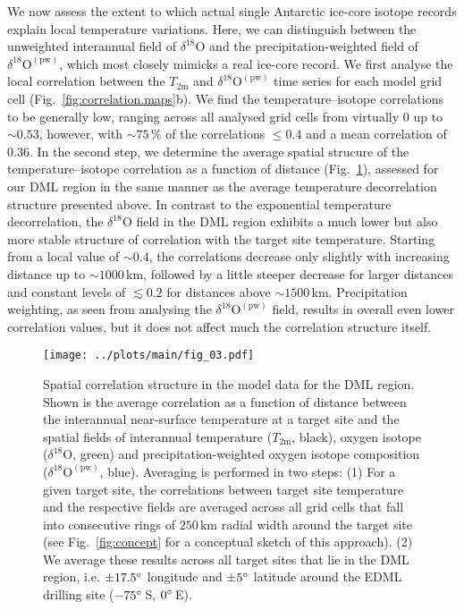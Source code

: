 \documentclass[cp, manuscript]{copernicus}
\begin{document}
We now assess the extent to which actual single Antarctic ice-core isotope
records explain local temperature variations. Here, we can distinguish between
the unweighted interannual field of $\delta^{18}\mathrm{O}$ and the
precipitation-weighted field of $\delta^{18}\mathrm{O}^{\mathrm{(pw)}}$, which
most closely mimicks a real ice-core record. We first analyse the local
correlation between the $T_{2\mathrm{m}}$ and
$\delta^{18}\mathrm{O}^{\mathrm{(pw)}}$ time series for each model grid cell
(Fig.~\ref{fig:correlation.maps}b). We find the temperature--isotope correlations
to be generally low, ranging across all analysed grid cells from virtually $0$
up to $\sim0.53$, however, with $\sim75\,\%$ of the correlations $\leq0.4$ and a
mean correlation of $0.36$. In the second step, we determine the average spatial
strucure of the temperature--isotope correlation as a function of distance
(Fig.~\ref{fig:avg.decor.lengths}), assessed for our DML region in the same
manner as the average temperature decorrelation structure presented above. In
contrast to the exponential temperature decorrelation, the
$\delta^{18}\mathrm{O}$ field in the DML region exhibits a much lower but also
more stable structure of correlation with the target site temperature. Starting
from a local value of $\sim0.4$, the correlations decrease only slightly with
increasing distance up to $\sim1000$\,km, followed by a little steeper decrease
for larger distances and constant levels of $\lesssim0.2$ for distances above
$\sim1500$\,km. Precipitation weighting, as seen from analysing the
$\delta^{18}\mathrm{O}^{\mathrm{(pw)}}$ field, results in overall even lower
correlation values, but it does not affect much the correlation structure
itself.

\begin{figure}[t]%
\centering
\texttt{[image: ../plots/main/fig\_03.pdf]}
\caption{%
  Spatial correlation structure in the model data for the DML region. Shown is
  the average correlation as a function of distance between the interannual
  near-surface temperature at a target site and the spatial fields of
  interannual temperature ($T_{2\mathrm{m}}$, black), oxygen isotope
  ($\delta^{18}\mathrm{O}$, green) and precipitation-weighted oxygen isotope
  composition ($\delta^{18}\mathrm{O}^{\mathrm{(pw)}}$, blue). Averaging is
  performed in two steps: (1) For a given target site, the correlations between
  target site temperature and the respective fields are averaged across all grid
  cells that fall into consecutive rings of $250$\,km radial width around the
  target site (see Fig.~\ref{fig:concept} for a conceptual sketch of this
  approach). (2) We average these results across all target sites that lie in
  the DML region, i.e. $\pm17.5^{\circ}$ longitude and $\pm5^{\circ}$ latitude
  around the EDML drilling site ($-75^{\circ}$\,S, $0^{\circ}$\,E).}
\label{fig:avg.decor.lengths}%
\end{figure}%
\end{document}
